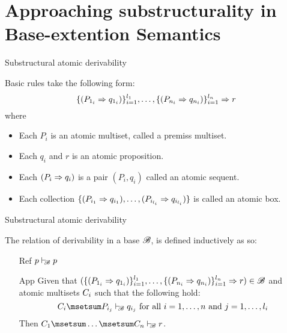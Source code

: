 \documentclass{beamer}
\begin{document}
\section{Approaching substructurality in Base-extention Semantics}
\begin{frame}{Substructural atomic derivability}
\begin{definition}
Basic rules take the following form: 
\[\openaddrule (\at{P}_{1_i} \seq \at{q}_{1_i})\closeaddrule^{l_1}_{i=1}, \dots, \openaddrule (\at{P}_{n_i} \seq \at{q}_{n_i})\closeaddrule^{l_n}_{i=1} \Rightarrow \at{r}\]
where 
\begin{itemize}
\item Each $P_i$ is an atomic multiset, called a premiss multiset.
\item Each $q_i$ and $r$ is an atomic proposition.
\item Each $(P_i \seq q_i)$ is a pair $(P_i, q_i)$ called an atomic sequent.
\item Each collection $\openaddrule (\at{P}_{i_1} \seq \at{q}_{i_1}), \dots, (\at{P}_{i_{l_i}} \seq \at{q}_{i_{l_i}})\closeaddrule$ is called an atomic box.
    \end{itemize}
\end{definition}
\end{frame}
\begin{frame}{Substructural atomic derivability}
\begin{definition}
The relation of derivability in a base $\baseB$, is defined inductively as so:
\begin{itemize}
\item[Ref] $p \deriveBaseM{\baseB} p$
\item[App] Given that $(\openaddrule(\at{P}_{1_i} \seq \at{q}_{1_{i}})\Closeaddrule{i=1}{l_1},\dots,\openaddrule(\at{P}_{n_i} \seq \at{q}_{n_{i}}) \Closeaddrule{i=1}{l_n} \Rightarrow \at{r}) \in \baseB$ and atomic multisets $\at{C}_i$ such that the following hold:
        \[\at{C}_i\msetsum \at{P}_{i_j} \deriveBaseM{\baseB} \at{q}_{i_j} \text{ for all } i = 1,\dots, n \text{ and } j = 1,\dots,l_i\]
Then $\at{C}_{1}\msetsum\dots\msetsum\at{C}_{n}\deriveBaseM{\baseB} r$. 
\end{itemize}
\end{definition}
\end{frame}
\end{document}
